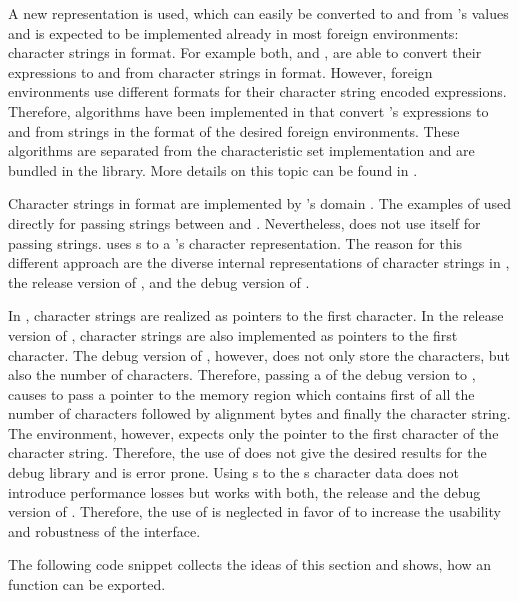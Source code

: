 A new representation is used, which can easily be converted to and from \Aldor's values and is expected to be implemented already in most foreign environments: character strings in \C format. For example both, \Maple and \Mathematica, are able to convert their expressions to and from character strings in \C format. However, foreign environments use different formats for their character string encoded expressions. Therefore, algorithms have been implemented in \Aldor that convert \Aldor's expressions to and from strings in the format of the desired foreign environments. These algorithms are separated from the characteristic set implementation and are bundled in the \LibExtIO library. More details on this topic can be found in .

Character strings in \C format are implemented by \LibAldor's domain . The examples of \cite{AldorUG} used  directly for passing strings between \C and \Aldor. Nevertheless, \LibCharSet does not use  itself for passing strings. \LibCharSet uses s to a 's character representation. The reason for this different approach are the diverse internal representations of character strings in \C, the release version of \LibAlgebra, and the debug version of \LibAlgebra.

In \C, character strings are realized as pointers to the first character. In the release version of \LibAldor, character strings are also implemented as pointers to the first character. The debug version of \LibAldor, however, does not only store the characters, but also the number of characters. Therefore, passing a  of the debug version to \C, causes to pass a pointer to the memory region which contains first of all the number of characters followed by alignment bytes and finally the character string. The \C environment, however, expects only the pointer to the first character of the character string. Therefore, the use of  does not give the desired results for the debug library and is error prone. Using s to the s character data does not introduce performance losses but works with both, the release and the debug version of \LibAldor. Therefore, the use of  is neglected in favor of  to increase the usability and robustness of the interface.

The following code snippet collects the ideas of this section and shows, how an \Aldor function can be exported.

